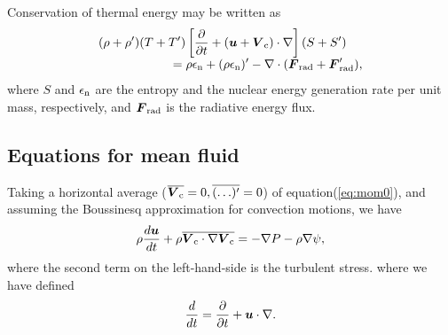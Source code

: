 \documentclass[fleqn,usenatbib]{mnras}
\def\bm#1{\mbox{\boldmath$#1$}}
\begin{document}
Conservation of thermal energy may be written as
\begin{equation}
\begin{array}{l}\displaystyle
(\rho+\rho')(T+T')\left[{\partial\over\partial t} + (\bm{u}+\bm{V}_{\rm c})\cdot\nabla\right](S+S')  \cr\displaystyle
\qquad \qquad \qquad = \rho\epsilon_{\rm n} + (\rho\epsilon_{\rm n})' 
- \nabla\cdot(\bm{F}_{\rm rad} + \bm{F}_{\rm rad}'),
\end{array}
\label{eq:energy0}
\end{equation}
where $S$ and $\epsilon_{\rm n}$ are the entropy and the nuclear energy 
generation rate per unit mass, respectively, 
and $\bm{F}_{\rm rad}$ is the radiative energy flux. 

\subsection{Equations for mean fluid}
Taking a horizontal average 
($\overline{\bm{V}_{\rm c}}=0, \overline{(\ldots)'}=0$) of equation(\ref{eq:mom0}),
and assuming the Boussinesq approximation for convection motions, we have
\begin{equation}
\rho{d\bm{u}\over d t}+\rho\overline{\bm{V}_{\rm c}\cdot\nabla\bm{V}_{\rm c}}
= -\nabla P - \rho\nabla\psi,
\label{eq:mom_mean2}
\end{equation}
where the second term on the left-hand-side is the turbulent stress.
where we have defined
\begin{equation}
{d\over d t} = {\partial\over\partial t} + \bm{u}\cdot\nabla.
\end{equation}
\end{document}

